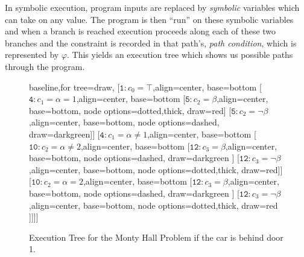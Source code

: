 \documentclass[acmsmall,review]{acmart}\settopmatter{}
\begin{document}
	
	
	
	In symbolic execution, program inputs are replaced by \textit{symbolic} variables which can take on any value.
	The program is then ``run'' on these symbolic variables and when a branch is reached execution proceeds along each of these two branches and the constraint is recorded in that path's, \textit{path condition}, which is represented by $\varphi$.
	This yields an execution tree which shows us possible paths through the program.
	
	
	\begin{figure}
		\label{fig:montyhall_tree}
		\centering
		{\footnotesize
			\begin{forest}baseline,for tree=draw,
				[{$\mathtt{1}: c_0=\top$},align=center, base=bottom
				[{$\mathtt{4}: c_1 = \alpha = 1$},align=center, base=bottom
				[{$\mathtt{5}: c_2 = \beta$},align=center, base=bottom, node options={dotted,thick}, draw=red] %
				[{$\mathtt{5}: c_2 = \neg\beta$},align=center, base=bottom, node options={dashed}, draw=darkgreen]] %
				[{$\mathtt{4}: c_1 = \alpha \neq 1$},align=center, base=bottom
				[{$\mathtt{10}: c_2 = \alpha \neq 2$},align=center, base=bottom
				[{$\mathtt{12}: c_3 = \beta$},align=center, base=bottom, node options={dashed}, draw=darkgreen ] %
				[{$\mathtt{12}: c_3 = \neg\beta$},align=center, base=bottom, node options={dotted,thick}, draw=red]] %
				[{$\mathtt{10}: c_2 = \alpha = 2$},align=center, base=bottom
				[{$\mathtt{12}: c_3 = \beta$},align=center, base=bottom, node options={dashed}, draw=darkgreen ] %
				[{$\mathtt{12}: c_3 = \neg\beta$},align=center, base=bottom, node options={dotted,thick}, draw=red ]]]] %
			\end{forest}
		}
		\caption{Execution Tree for the Monty Hall Problem if the car is behind door 1.}
	\end{figure}
	
\end{document}

